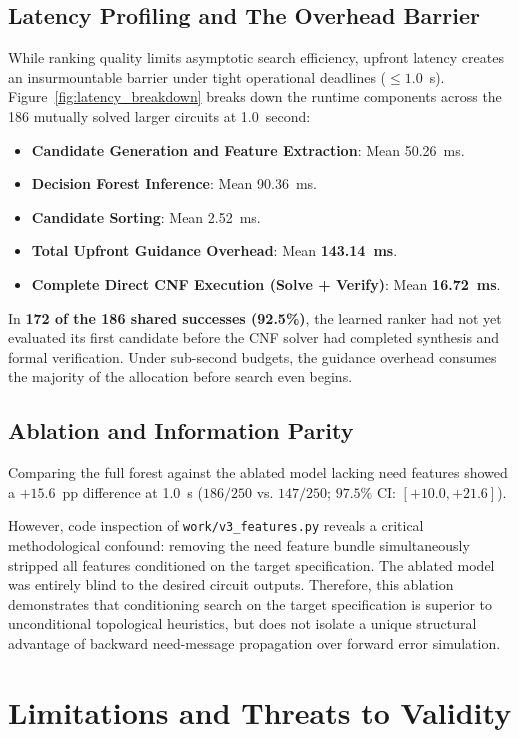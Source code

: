 \documentclass[10pt,journal,compsoc]{IEEEtran}
\begin{document}
\subsection{Latency Profiling and The Overhead Barrier}
While ranking quality limits asymptotic search efficiency, upfront latency creates an insurmountable barrier under tight operational deadlines ($\le 1.0$~s). Figure~\ref{fig:latency_breakdown} breaks down the runtime components across the 186 mutually solved larger circuits at 1.0~second:
\begin{itemize}
    \item \textbf{Candidate Generation and Feature Extraction}: Mean 50.26~ms.
    \item \textbf{Decision Forest Inference}: Mean 90.36~ms.
    \item \textbf{Candidate Sorting}: Mean 2.52~ms.
    \item \textbf{Total Upfront Guidance Overhead}: Mean \textbf{143.14~ms}.
    \item \textbf{Complete Direct CNF Execution (Solve + Verify)}: Mean \textbf{16.72~ms}.
\end{itemize}

In \textbf{172 of the 186 shared successes (92.5\%)}, the learned ranker had not yet evaluated its first candidate before the CNF solver had completed synthesis and formal verification. Under sub-second budgets, the guidance overhead consumes the majority of the allocation before search even begins.

\subsection{Ablation and Information Parity}
Comparing the full forest against the ablated model lacking need features showed a $+15.6$~pp difference at 1.0~s ($186/250$ vs. $147/250$; $97.5\%$ CI: $[+10.0, +21.6]$). 

However, code inspection of \texttt{work/v3\_features.py} reveals a critical methodological confound: removing the need feature bundle simultaneously stripped all features conditioned on the target specification. The ablated model was entirely blind to the desired circuit outputs. Therefore, this ablation demonstrates that conditioning search on the target specification is superior to unconditional topological heuristics, but does not isolate a unique structural advantage of backward need-message propagation over forward error simulation.

\section{Limitations and Threats to Validity}
\end{document}
